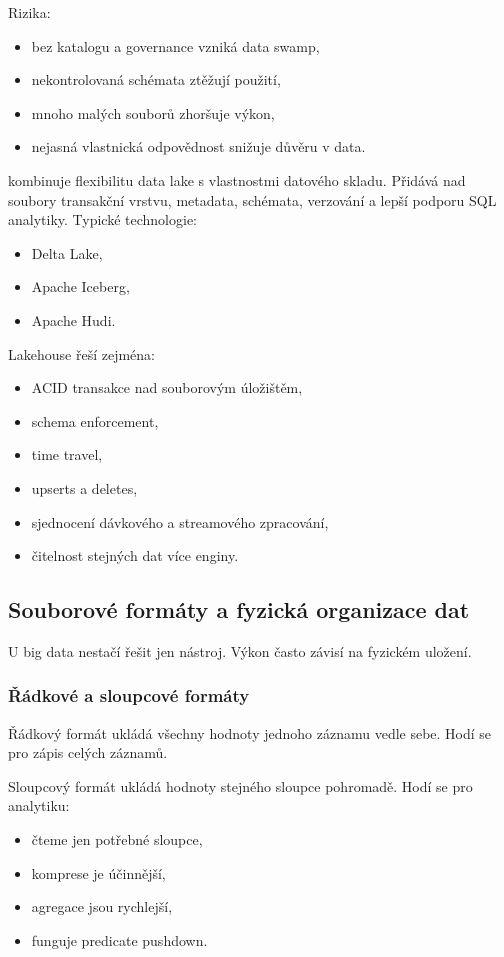 Rizika:
\begin{itemize}
    \item bez katalogu a governance vzniká data swamp,
    \item nekontrolovaná schémata ztěžují použití,
    \item mnoho malých souborů zhoršuje výkon,
    \item nejasná vlastnická odpovědnost snižuje důvěru v data.
\end{itemize}

 kombinuje flexibilitu data lake s vlastnostmi datového skladu. Přidává nad soubory
transakční vrstvu, metadata, schémata, verzování a lepší podporu SQL analytiky. Typické technologie:
\begin{itemize}
    \item Delta Lake,
    \item Apache Iceberg,
    \item Apache Hudi.
\end{itemize}

Lakehouse řeší zejména:
\begin{itemize}
    \item ACID transakce nad souborovým úložištěm,
    \item schema enforcement,
    \item time travel,
    \item upserts a deletes,
    \item sjednocení dávkového a streamového zpracování,
    \item čitelnost stejných dat více enginy.
\end{itemize}

\subsection{Souborové formáty a fyzická organizace dat}

U big data nestačí řešit jen nástroj. Výkon často závisí na fyzickém uložení.

\subsubsection{Řádkové a sloupcové formáty}

Řádkový formát ukládá všechny hodnoty jednoho záznamu vedle sebe. Hodí se pro zápis celých záznamů.

Sloupcový formát ukládá hodnoty stejného sloupce pohromadě. Hodí se pro analytiku:
\begin{itemize}
    \item čteme jen potřebné sloupce,
    \item komprese je účinnější,
    \item agregace jsou rychlejší,
    \item funguje predicate pushdown.
\end{itemize}

